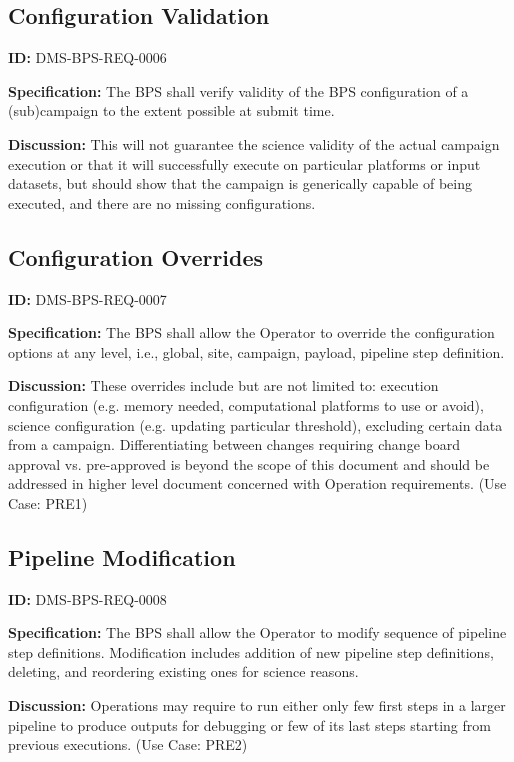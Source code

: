 \documentclass[SE,toc,lsstdraft]{lsstdoc}
\begin{document}
\subsection{Configuration Validation}

\label{DMS-BPS-REQ-0006}
\textbf{ID:} DMS-BPS-REQ-0006

\textbf{Specification:}
The BPS shall verify validity of the BPS configuration of a (sub)campaign to the extent possible at submit time.

\textbf{Discussion:}
This will not guarantee the science validity of the actual campaign execution or that it will successfully execute on particular platforms or input datasets, but should show that the campaign is generically capable of being executed, and there are no missing configurations.

\subsection{Configuration Overrides}

\label{DMS-BPS-REQ-0007}
\textbf{ID:} DMS-BPS-REQ-0007

\textbf{Specification:}
The BPS shall allow the Operator to override the configuration options at any level, i.e., global, site, campaign, payload, pipeline step definition.

\textbf{Discussion:}
These overrides include but are not limited to: execution configuration (e.g. memory needed, computational platforms to use or avoid), science configuration (e.g. updating particular threshold), excluding certain data from a campaign. Differentiating between changes requiring change board approval vs. pre-approved is beyond the scope of this document and should be addressed in higher level document concerned with Operation requirements. (Use Case: PRE1)

\subsection{Pipeline Modification}

\label{DMS-BPS-REQ-0008}
\textbf{ID:} DMS-BPS-REQ-0008

\textbf{Specification:}
The BPS shall allow the Operator to modify sequence of pipeline step definitions.  Modification includes addition of new pipeline step definitions, deleting, and reordering existing ones for science reasons.

\textbf{Discussion:}
Operations may require to run either only few first steps in a larger pipeline to produce outputs for debugging or few of its last steps starting from previous executions. (Use Case: PRE2)
\end{document}
